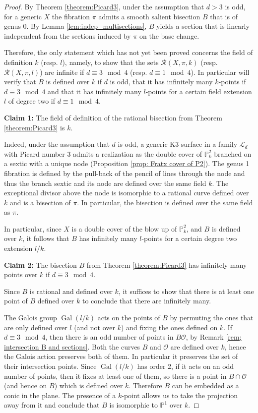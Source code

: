 \documentclass{amsart}
\theoremstyle{definition}
\numberwithin{equation}{section}
\DeclareMathOperator{\Gal}{Gal}
\begin{document}
\begin{proof}
By Theorem \ref{theorem:Picard3}, under the assumption that $d>3$ is odd,  for a generic $X$  the fibration $\pi$ admits a smooth salient bisection $B$ that is of genus 0. By Lemma \ref{lem:indep_multisections}, $B$ yields a section that is linearly independent from the sections induced by $\pi$ on the base change.

Therefore, the only statement which has not yet been proved concerns the field of definition $k$ (resp. $l$), namely, to show that the sets $\mathcal{R}(X,\pi, k)$ (resp. $\mathcal{R}(X,\pi, l)$) are infinite if $d\equiv 3\mod 4$ (resp. $d\equiv 1\mod 4$). In particular will  verify that $B$ is defined over $k$ if $d$ is odd, that it has infinitely many $k$-points if $d\equiv 3\mod 4$ and that it has infinitely many $l$-points for a certain field extension $l$ of degree two if $d\equiv 1\mod 4$. 

\textbf{Claim 1:} The field of definition of the rational bisection from Theorem \ref{theorem:Picard3} is $k$. 

Indeed, under the assumption that $d$ is odd, a generic K3 surface in a family $\mathcal{L}_d$ with Picard number 3 admits a realization as the double cover of $\mathbb{P}^2_{k}$ branched on a sextic with a unique node (Proposition \ref{prop: Fratx cover of P2}). The genus 1 fibration is defined by the pull-back of the pencil of lines through the node and thus the branch sextic and its node are defined over the same field $k$. The exceptional divisor above the node is isomorphic to a rational curve defined over $k$ and is a bisection of $\pi$. In particular, the bisection is defined over the same field as $\pi$. 

In particular, since $X$ is a double cover of the blow up of $\mathbb{P}^2_{k}$, and $B$ is defined over $k$, it follows that $B$ has infinitely many $l$-points for a certain degree two extension $l/k$.

\textbf{Claim 2:} The bisection $B$ from Theorem \ref{theorem:Picard3} has infinitely many points over $k$ if $d\equiv 3\mod 4$.

Since $B$ is rational and defined over $k$, it suffices to show that there is at least one point of $B$ defined over $k$ to conclude that there are infinitely many.

The Galois group $\Gal(l/k)$ acts on the points of $B$ by permuting the ones that are only defined over $l$ (and not over $k$) and fixing the ones defined on $k$. If $d\equiv 3 \mod 4$, then there is an odd number of points in $B\mathcal{O}$, by Remark \ref{rem; intersection B and sections}. Both the curves $B$ and $\mathcal{O}$ are defined over $k$, hence the Galois action preserves both of them. In particular it preserves the set of their intersection points. Since $\Gal(l/k)$ has order 2, if it acts on an odd number of points, then it fixes at least one of them, so there is a point in $B\cap \mathcal{O}$ (and hence on $B$) which is defined over $k$. Therefore $B$ can be embedded as a conic in the plane. The presence of a $k$-point allows us to take the projection away from it and conclude that $B$ is isomorphic to $\mathbb{P}^1$ over $k$.
\end{proof}
\end{document}
